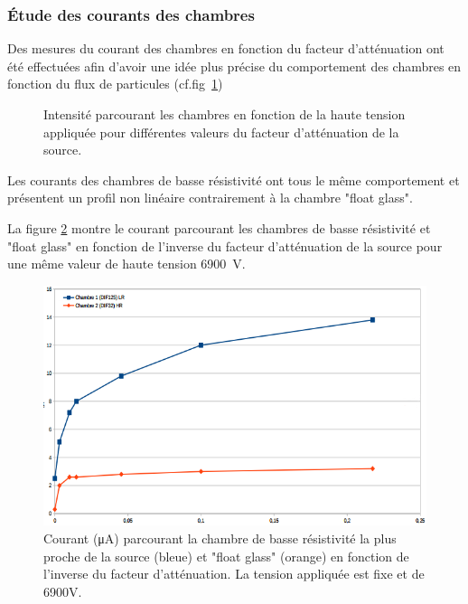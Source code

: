 \subsubsection{Étude des courants des chambres}
Des mesures du courant des chambres en fonction du facteur d'atténuation ont été effectuées afin d'avoir une idée plus précise du comportement des chambres en fonction du flux de particules (cf.fig~\ref{courant})

\begin{figure}[ht!]
	\centering
	\hfill
	\caption{Intensité parcourant les chambres en fonction de la haute tension appliquée pour différentes valeurs du facteur d'atténuation de la source.}
	\label{courant}
\end{figure}


Les courants des chambres de basse résistivité ont tous le même comportement et présentent un profil non linéaire contrairement à la chambre "float glass".

La figure \ref{currentsamHV} montre le courant parcourant les chambres de basse résistivité et "float glass" en fonction de l'inverse du facteur d'atténuation de la source pour une même valeur de haute tension \SI{6900}{\volt}.

\begin{figure}[ht!]
	\centering
	\includegraphics[width=.6\linewidth]{GLA/current_same_HV.png}
	\caption{Courant (\si{\micro\ampere}) parcourant la chambre de basse résistivité la plus proche de la source (bleue) et "float glass" (orange) en fonction de l'inverse du facteur d'atténuation. La tension appliquée est fixe et de 6900V.}
	\label{currentsamHV}
\end{figure}

